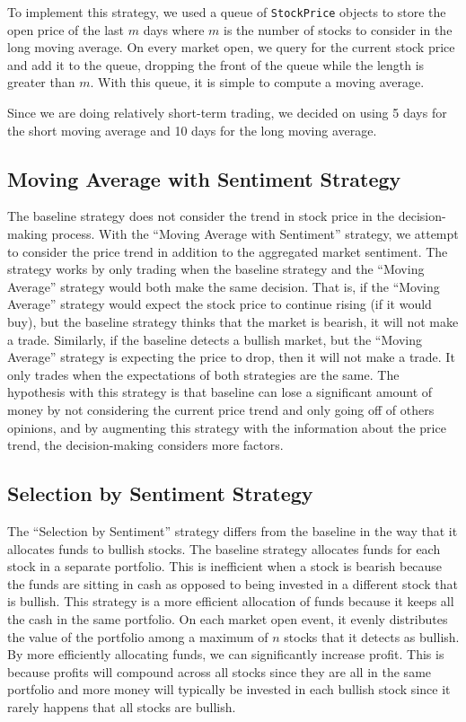 To implement this strategy, we used a queue of \texttt{StockPrice} objects to store the open price of the last $m$ days where $m$ is the number of stocks to consider in the long moving average. On every market open, we query for the current stock price and add it to the queue, dropping the front of the queue while the length is greater than $m$. With this queue, it is simple to compute a moving average.

Since we are doing relatively short-term trading, we decided on using 5 days for the short moving average and 10 days for the long moving average.

\subsection{Moving Average with Sentiment Strategy}

The baseline strategy does not consider the trend in stock price in the decision-making process. With the ``Moving Average with Sentiment'' strategy, we attempt to consider the price trend in addition to the aggregated market sentiment. The strategy works by only trading when the baseline strategy and the ``Moving Average'' strategy would both make the same decision. That is, if the ``Moving Average'' strategy would expect the stock price to continue rising (if it would buy), but the baseline strategy thinks that the market is bearish, it will not make a trade. Similarly, if the baseline detects a bullish market, but the ``Moving Average'' strategy is expecting the price to drop, then it will not make a trade. It only trades when the expectations of both strategies are the same. The hypothesis with this strategy is that baseline can lose a significant amount of money by not considering the current price trend and only going off of others opinions, and by augmenting this strategy with the information about the price trend, the decision-making considers more factors. 

\subsection{Selection by Sentiment Strategy}

The ``Selection by Sentiment'' strategy differs from the baseline in the way that it allocates funds to bullish stocks. The baseline strategy allocates funds for each stock in a separate portfolio. This is inefficient when a stock is bearish because the funds are sitting in cash as opposed to being invested in a different stock that is bullish. This strategy is a more efficient allocation of funds because it keeps all the cash in the same portfolio. On each market open event, it evenly distributes the value of the portfolio among a maximum of $n$ stocks that it detects as bullish. By more efficiently allocating funds, we can significantly increase profit. This is because profits will compound across all stocks since they are all in the same portfolio and more money will typically be invested in each bullish stock since it rarely happens that all stocks are bullish.

